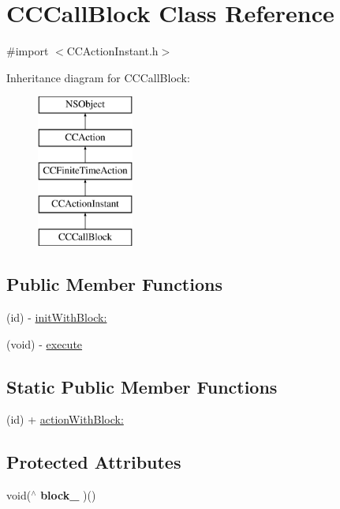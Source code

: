 \hypertarget{interface_c_c_call_block}{\section{C\-C\-Call\-Block Class Reference}
\label{interface_c_c_call_block}
}


{\ttfamily \#import $<$C\-C\-Action\-Instant.\-h$>$}

Inheritance diagram for C\-C\-Call\-Block\-:\begin{figure}[H]
\begin{center}
\leavevmode
\includegraphics[height=5.000000cm]{interface_c_c_call_block}
\end{center}
\end{figure}
\subsection*{Public Member Functions}
\begin{DoxyCompactItemize}
\item 
(id) -\/ \hyperlink{interface_c_c_call_block_acbef214171e4c9f5e839f49456dd828c}{init\-With\-Block\-:}
\item 
(void) -\/ \hyperlink{interface_c_c_call_block_a7258136a4dee77dad39e3042c9ddda85}{execute}
\end{DoxyCompactItemize}
\subsection*{Static Public Member Functions}
\begin{DoxyCompactItemize}
\item 
(id) + \hyperlink{interface_c_c_call_block_af6c26ff480be2724141d81d867af2e11}{action\-With\-Block\-:}
\end{DoxyCompactItemize}
\subsection*{Protected Attributes}
\begin{DoxyCompactItemize}
\item 
\hypertarget{interface_c_c_call_block_afa0e9c4cf4a7538fa86d9c5fa44661b1}{void($^\wedge$ {\bfseries block\-\_\-} )()}\label{interface_c_c_call_block_afa0e9c4cf4a7538fa86d9c5fa44661b1}

\end{DoxyCompactItemize}


